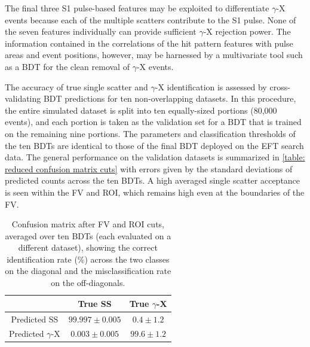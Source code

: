 \documentclass[reprint, showpacs,
preprintnumbers,
amsmath,amssymb,
aps, floatfix,
superscriptaddress,
prd, nofootinbib]{revtex4-1}
\begin{document}
The final three S1 pulse-based features may be exploited to differentiate $\gamma$-X events because each of the multiple scatters contribute to the S1 pulse. 
None of the seven features individually can provide sufficient $\gamma$-X rejection power. 
The information contained in the correlations of the hit pattern features with pulse areas and event positions, however, may be harnessed by a multivariate tool such as a BDT for the clean removal of $\gamma$-X events.  
\par
The accuracy of true single scatter and $\gamma$-X identification is assessed by cross-validating BDT predictions for ten non-overlapping datasets.
In this procedure, the entire simulated dataset is split into ten equally-sized portions (80,000 events), and each portion is taken as the validation set for a BDT that is trained on the remaining nine portions.
The parameters and classification thresholds of the ten BDTs are identical to those of the final BDT deployed on the EFT search data. 
The general performance on the validation datasets is summarized in \autoref{table: reduced confusion matrix cuts} with errors given by the standard deviations of predicted counts across the ten BDTs. 
A high averaged single scatter acceptance is seen within the FV and ROI, which remains high even at the boundaries of the FV. 
\begin{table}
    \begin{center}
    \caption{Confusion matrix after FV and ROI cuts, averaged over ten BDTs (each evaluated on a different dataset), showing the correct identification rate (\%) across the two classes on the diagonal and the misclassification rate on the off-diagonals.}
        \begin{ruledtabular}
            \begin{tabular}{c|cc}
                 & True SS & True $\gamma$-X \\
                \hline
                Predicted SS & $99.997 \pm 0.005$ & $0.4 \pm 1.2$ \\
                Predicted $\gamma$-X & $0.003 \pm 0.005$ & $99.6 \pm 1.2$ \\
            \end{tabular}
        \end{ruledtabular}
    \end{center}
    \label{table: reduced confusion matrix cuts}
\end{table}
\end{document}
